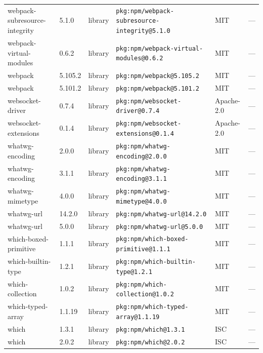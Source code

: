 \documentclass[11pt,a4paper]{article}
\begin{document}
\begin{longtable}{|p{4cm}|p{2cm}|p{1.6cm}|p{5cm}|p{1.5cm}|p{3.5cm}|}
\raggedright webpack-subresource-integrity & 5.1.0 & library & \small\texttt{pkg:npm/webpack-subresource-integrity@5.1.0} & MIT & \small — \\
\raggedright webpack-virtual-modules & 0.6.2 & library & \small\texttt{pkg:npm/webpack-virtual-modules@0.6.2} & MIT & \small — \\
\raggedright webpack & 5.105.2 & library & \small\texttt{pkg:npm/webpack@5.105.2} & MIT & \small — \\
\raggedright webpack & 5.101.2 & library & \small\texttt{pkg:npm/webpack@5.101.2} & MIT & \small — \\
\raggedright websocket-driver & 0.7.4 & library & \small\texttt{pkg:npm/websocket-driver@0.7.4} & Apache-2.0 & \small — \\
\raggedright websocket-extensions & 0.1.4 & library & \small\texttt{pkg:npm/websocket-extensions@0.1.4} & Apache-2.0 & \small — \\
\raggedright whatwg-encoding & 2.0.0 & library & \small\texttt{pkg:npm/whatwg-encoding@2.0.0} & MIT & \small — \\
\raggedright whatwg-encoding & 3.1.1 & library & \small\texttt{pkg:npm/whatwg-encoding@3.1.1} & MIT & \small — \\
\raggedright whatwg-mimetype & 4.0.0 & library & \small\texttt{pkg:npm/whatwg-mimetype@4.0.0} & MIT & \small — \\
\raggedright whatwg-url & 14.2.0 & library & \small\texttt{pkg:npm/whatwg-url@14.2.0} & MIT & \small — \\
\raggedright whatwg-url & 5.0.0 & library & \small\texttt{pkg:npm/whatwg-url@5.0.0} & MIT & \small — \\
\raggedright which-boxed-primitive & 1.1.1 & library & \small\texttt{pkg:npm/which-boxed-primitive@1.1.1} & MIT & \small — \\
\raggedright which-builtin-type & 1.2.1 & library & \small\texttt{pkg:npm/which-builtin-type@1.2.1} & MIT & \small — \\
\raggedright which-collection & 1.0.2 & library & \small\texttt{pkg:npm/which-collection@1.0.2} & MIT & \small — \\
\raggedright which-typed-array & 1.1.19 & library & \small\texttt{pkg:npm/which-typed-array@1.1.19} & MIT & \small — \\
\raggedright which & 1.3.1 & library & \small\texttt{pkg:npm/which@1.3.1} & ISC & \small — \\
\raggedright which & 2.0.2 & library & \small\texttt{pkg:npm/which@2.0.2} & ISC & \small — \\

\end{longtable}
\end{document}
